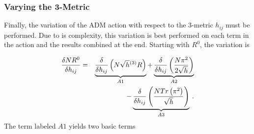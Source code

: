 \subsubsection{Varying the 3-Metric}

Finally, the variation of the ADM action with respect to the 3-metric $h_{ij}$
must be performed.  Due to is complexity, this variation is best performed
on each term in the action and the results combined at the end.  Starting with
$R^0$, the variation is

\begin{eqnarray*}
   \frac{\delta N R^0}{\delta h_{ij}} & = &
   \underbrace{\frac{\delta}{\delta h_{ij}} \left( N \sqrt{h} {}^{(3)}R \right)}
              _{A1}
  +\underbrace{\frac{\delta}{\delta h_{ij}} \left( \frac{N \pi^2}{2 \sqrt{h}} \right)}
              _{A2} \\
  & &
  -\underbrace{\frac{\delta}{\delta h_{ij}} \left( \frac{N Tr \left(\pi^2 \right)}
                                                   {\sqrt{h}} \right)}
              _{A3} \: .
\end{eqnarray*}
The term labeled $A1$ yields two basic terms

